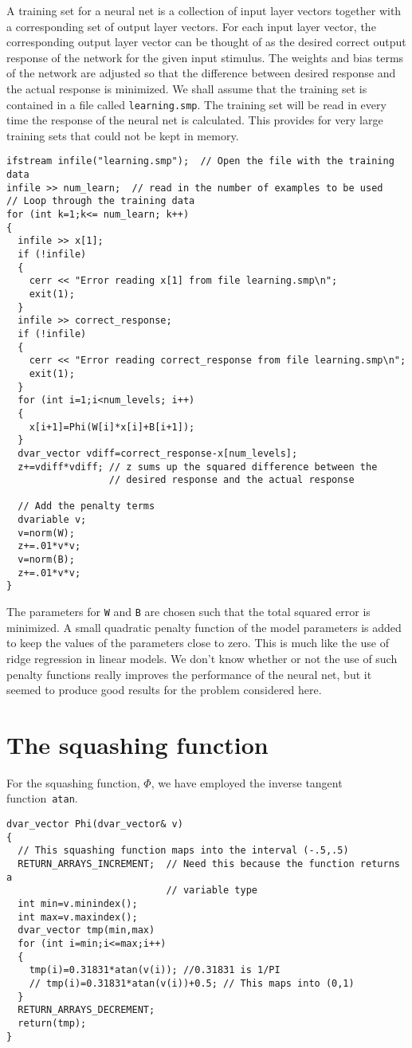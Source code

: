 \documentclass{admbmanual}
\begin{document}
A training set for a neural net is a collection of input layer vectors together
with a corresponding set of output layer vectors. For each input layer vector,
the corresponding output layer vector can be thought of as the desired correct
output response of the network for the given input stimulus. The weights and
bias terms of the network are adjusted so that the difference between desired
response and the actual response is minimized. We shall assume that the training
set is contained in a file called \texttt{learning.smp}. The training set will
be read in every time the response of the neural net is calculated. This
provides for very large training sets that could not be kept in memory.
\begin{lstlisting}
ifstream infile("learning.smp");  // Open the file with the training data
infile >> num_learn;  // read in the number of examples to be used
// Loop through the training data
for (int k=1;k<= num_learn; k++)
{
  infile >> x[1];
  if (!infile)
  {
    cerr << "Error reading x[1] from file learning.smp\n";
    exit(1);
  }
  infile >> correct_response;
  if (!infile)
  {
    cerr << "Error reading correct_response from file learning.smp\n";
    exit(1);
  }
  for (int i=1;i<num_levels; i++)
  {
    x[i+1]=Phi(W[i]*x[i]+B[i+1]);
  }
  dvar_vector vdiff=correct_response-x[num_levels];
  z+=vdiff*vdiff; // z sums up the squared difference between the
                  // desired response and the actual response

  // Add the penalty terms
  dvariable v;
  v=norm(W);
  z+=.01*v*v;
  v=norm(B);
  z+=.01*v*v;
}
\end{lstlisting}

The parameters for \texttt{W} and \texttt{B} are chosen such that the total
squared error is minimized. A small quadratic penalty function of the model
parameters is added to keep the values of the parameters close to zero. This is
much like the use of ridge regression \cite{hoerlkennard1970} in linear models.
We don't know whether or not the use of such penalty functions really improves
the performance of the neural net, but it seemed to produce good results for the
problem considered here.

\section{The squashing function}

For the squashing function, $\Phi$, we have employed the inverse tangent
function~\texttt{atan}.
\begin{lstlisting}
dvar_vector Phi(dvar_vector& v)
{
  // This squashing function maps into the interval (-.5,.5)
  RETURN_ARRAYS_INCREMENT;  // Need this because the function returns a
                            // variable type
  int min=v.minindex();
  int max=v.maxindex();
  dvar_vector tmp(min,max)
  for (int i=min;i<=max;i++)
  {
    tmp(i)=0.31831*atan(v(i)); //0.31831 is 1/PI
    // tmp(i)=0.31831*atan(v(i))+0.5; // This maps into (0,1)
  }
  RETURN_ARRAYS_DECREMENT;
  return(tmp);
}
\end{lstlisting}
\end{document}
